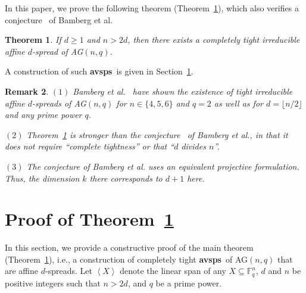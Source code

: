 \documentclass[11pt]{amsart}
\newtheorem{theorem}{Theorem}
\newtheorem{rmk}[theorem]{Remark}
\def \n{\noindent }
\def \ra{\right\rangle}
\def \la{\left\langle}
\def \F{{\mathbb F}}
\def \avsps{\mbox{\bf avsps}}
\begin{document}
In this paper, we prove the following theorem (Theorem~\ref{thm:1}), which also verifies a conjecture~\cite[Conjecture~1]{BFIK} of Bamberg et al.
%
\begin{theorem}\label{thm:1}
If $d \geq 1$ and $n>2d$, then there exists a completely tight irreducible affine $d$-spread of AG$(n,q)$.  
\end{theorem}
%
A construction of such \avsps~is given in Section~\ref{sec:prf-main}.
%
\begin{rmk}

\n $(1)$  Bamberg et al.~\cite{BFIK} have shown the existence of tight irreducible affine $d$-spreads of AG$(n,q)$ for $n\in \{4,5,6\}$ and $q=2$ as well as for $d=\lfloor n/2 \rfloor$ and any prime power $q$. 

\n $(2)$  Theorem~\ref{thm:1} is stronger than the conjecture~\cite[Conjecture~1]{BFIK} of Bamberg et al.,  in that it does not require ``complete tightness'' or that ``$d$ divides $n$''.

\n $(3)$ The conjecture \cite[Conjecture~1]{BFIK} of Bamberg et al. uses an equivalent projective formulation. Thus, the dimension $k$ there  corresponds to $d+1$ here. 
\end{rmk}
%
\section{Proof of Theorem~\ref{thm:1}}\label{sec:prf-main}
In this section, we provide a constructive proof of the main theorem (Theorem~\ref{thm:1}), i.e., a construction of completely tight \avsps~of  AG$(n,q)$ that are affine $d$-spreads.  Let $\la X\ra$ denote the linear span of  any $X\subseteq \F_q^n$, $d$ and $n$ be positive integers such that $n>2d$, and $q$ be a prime power.
%
\end{document}
